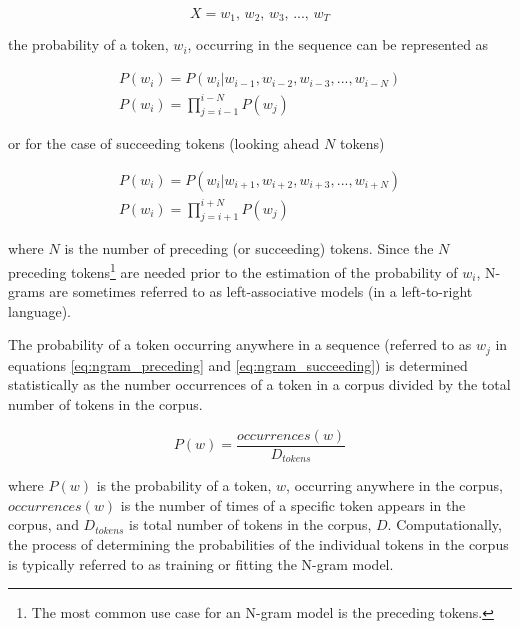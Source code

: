 \documentclass[12pt]{article}
\begin{document}
\begin{equation}\label{eq:ngram_sequence}
    X = \mbox{$w_1$, $w_2$, $w_3$, ..., $w_T$}
\end{equation}

\noindent
the probability of a token, $w_i$, occurring in the sequence can be represented as

\begin{equation}\label{eq:ngram_preceding}
    \begin{gathered}
        P(w_i) = P(w_i|w_{i-1},w_{i-2},w_{i-3},...,w_{i-N}) \\
        P(w_i) = \prod_{j=i-1}^{i-N} P(w_j)
    \end{gathered}
\end{equation}

\noindent
or for the case of succeeding tokens (looking ahead $N$ tokens)

\begin{equation}\label{eq:ngram_succeeding}
    \begin{gathered}
        P(w_i) = P(w_i|w_{i+1},w_{i+2},w_{i+3},...,w_{i+N}) \\
        P(w_i) = \prod_{j=i+1}^{i+N} P(w_j)
    \end{gathered}
\end{equation}

\noindent
where $N$ is the number of preceding (or succeeding) tokens. Since the $N$ preceding tokens\footnote{The most common use case for an N-gram model is
    the preceding tokens.} are needed prior to the estimation of the probability of $w_i$, N-grams are sometimes referred to as left-associative
models (in a left-to-right language).

The probability of a token occurring anywhere in a sequence (referred to as $w_j$ in equations \ref{eq:ngram_preceding} and \ref{eq:ngram_succeeding})
is determined statistically as the number occurrences of a token in a corpus divided by the total number of tokens in the corpus.

\begin{equation}\label{eq:ngram_prob_wj}
    P(w) = \frac{\textit{occurrences}(w)}{D_{tokens}}
\end{equation}

\noindent
where $P(w)$ is the probability of a token, $w$, occurring anywhere in the corpus, $\textit{occurrences}(w)$ is the number of times of a specific
token appears in the corpus, and $D_{tokens}$ is total number of tokens in the corpus, $D$. Computationally, the process of determining the
probabilities of the individual tokens in the corpus is typically referred to as training or fitting the N-gram model.
\end{document}
